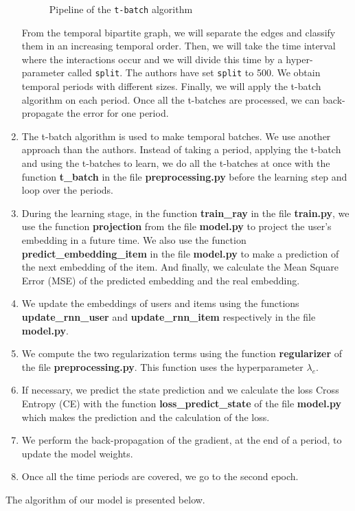 \begin{enumerate}
\begin{figure}[H]
        \caption{Pipeline of the \texttt{t-batch} algorithm}
    \end{figure}
    From the temporal bipartite graph, we will separate the edges and classify them in an increasing temporal order. Then, we will take the time interval where the interactions occur and we will divide this time by a hyper-parameter called \texttt{split}. The authors have set \texttt{split} to 500. We obtain temporal periods with different sizes. Finally, we will apply the t-batch algorithm on each period. Once all the t-batches are processed, we can back-propagate the error for one period.
    \item The t-batch algorithm is used to make temporal batches. We use another approach than the authors. Instead of taking a period, applying the t-batch and using the t-batches to learn, we do all the t-batches at once with the function \textbf{t\_batch} in the file \textbf{preprocessing.py} before the learning step and loop over the periods.
    \item During the learning stage, in the function \textbf{train\_ray} in the file \textbf{train.py}, we use the function \textbf{projection} from the file \textbf{model.py} to project the user's embedding in a future time. We also use the function \textbf{predict\_embedding\_item} in the file \textbf{model.py} to make a prediction of the next embedding of the item. And finally, we calculate the Mean Square Error (MSE) of the predicted embedding and the real embedding.
    \item We update the embeddings of users and items using the functions \textbf{update\_rnn\_user} and \textbf{update\_rnn\_item} respectively in the file \textbf{model.py}.
    \item We compute the two regularization terms using the function \textbf{regularizer} of the file \textbf{preprocessing.py}. This function uses the hyperparameter $\lambda_e$.
    \item If necessary, we predict the state prediction and we calculate the loss Cross Entropy (CE) with the function \textbf{loss\_predict\_state} of the file \textbf{model.py} which makes the prediction and the calculation of the loss.
    \item We perform the back-propagation of the gradient, at the end of a period, to update the model weights.
    \item Once all the time periods are covered, we go to the second epoch.
\end{enumerate}
The algorithm of our model is presented below.
